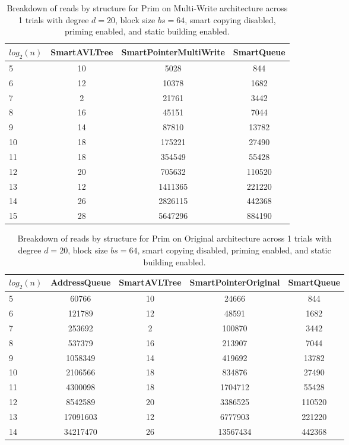 \begin{table}[]
\centering
\begin{tabular}{|l|c|c|c|}
$log_2(n)$ & SmartAVLTree & SmartPointerMultiWrite & SmartQueue \\ \hline
5 & 10 & 5028 & 844 \\ \hline
6 & 12 & 10378 & 1682 \\ \hline
7 & 2 & 21761 & 3442 \\ \hline
8 & 16 & 45151 & 7044 \\ \hline
9 & 14 & 87810 & 13782 \\ \hline
10 & 18 & 175221 & 27490 \\ \hline
11 & 18 & 354549 & 55428 \\ \hline
12 & 20 & 705632 & 110520 \\ \hline
13 & 12 & 1411365 & 221220 \\ \hline
14 & 26 & 2826115 & 442368 \\ \hline
15 & 28 & 5647296 & 884190 \\ \hline
\end{tabular}
\caption{Breakdown of reads by structure for Prim on Multi-Write architecture across 1 trials with degree $d=20$, block size $bs=64$, smart copying disabled, priming enabled, and static building enabled.}
    \label{tab:reads_by_structure_prim_d20_bs64_trials1_copiesfalse_primetrue_staticinsertiontrue_ptmultiwrite_movetrue}
\end{table}

\begin{table}[]
\centering
\begin{tabular}{|l|c|c|c|c|}
$log_2(n)$ & AddressQueue & SmartAVLTree & SmartPointerOriginal & SmartQueue \\ \hline
5 & 60766 & 10 & 24666 & 844 \\ \hline
6 & 121789 & 12 & 48591 & 1682 \\ \hline
7 & 253692 & 2 & 100870 & 3442 \\ \hline
8 & 537379 & 16 & 213907 & 7044 \\ \hline
9 & 1058349 & 14 & 419692 & 13782 \\ \hline
10 & 2106566 & 18 & 834876 & 27490 \\ \hline
11 & 4300098 & 18 & 1704712 & 55428 \\ \hline
12 & 8542589 & 20 & 3386525 & 110520 \\ \hline
13 & 17091603 & 12 & 6777903 & 221220 \\ \hline
14 & 34217470 & 26 & 13567434 & 442368 \\ \hline
\end{tabular}
\caption{Breakdown of reads by structure for Prim on Original architecture across 1 trials with degree $d=20$, block size $bs=64$, smart copying disabled, priming enabled, and static building enabled.}
    \label{tab:reads_by_structure_prim_d20_bs64_trials1_copiesfalse_primetrue_staticinsertiontrue_ptoriginal_movefalse}
\end{table}

